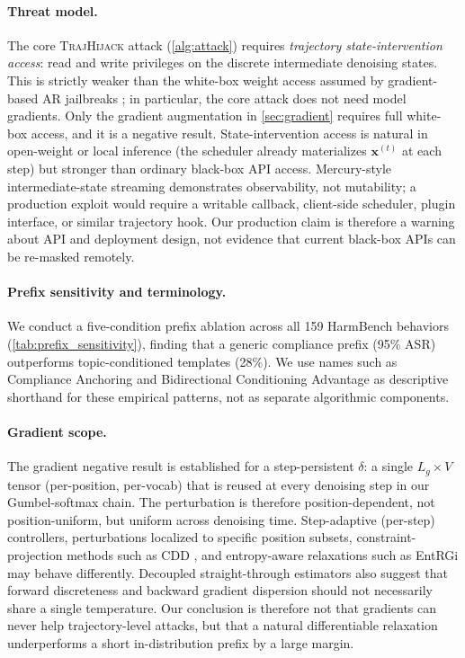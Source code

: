 \documentclass{article}
\theoremstyle{coloredthm}
\newcommand{\method}{\textsc{TrajHijack}}
\begin{document}
\paragraph{Threat model.} The core \method{} attack (\cref{alg:attack}) requires \emph{trajectory state-intervention access}: read and write privileges on the discrete intermediate denoising states. This is strictly weaker than the white-box weight access assumed by gradient-based AR jailbreaks \citep{zou2023gcg, carlini2023adversarial}; in particular, the core attack does not need model gradients. Only the gradient augmentation in \cref{sec:gradient} requires full white-box access, and it is a negative result. State-intervention access is natural in open-weight or local inference (the scheduler already materializes $\mathbf{x}^{(t)}$ at each step) but stronger than ordinary black-box API access. Mercury-style intermediate-state streaming demonstrates observability, not mutability; a production exploit would require a writable callback, client-side scheduler, plugin interface, or similar trajectory hook. Our production claim is therefore a warning about API and deployment design, not evidence that current black-box APIs can be re-masked remotely.

\paragraph{Prefix sensitivity and terminology.} We conduct a five-condition prefix ablation across all 159 HarmBench behaviors (\cref{tab:prefix_sensitivity}), finding that a generic compliance prefix (95\% ASR) outperforms topic-conditioned templates (28\%). We use names such as Compliance Anchoring and Bidirectional Conditioning Advantage as descriptive shorthand for these empirical patterns, not as separate algorithmic components.

\paragraph{Gradient scope.} The gradient negative result is established for a step-persistent $\delta$: a single $L_g \times V$ tensor (per-position, per-vocab) that is reused at every denoising step in our Gumbel-softmax chain. The perturbation is therefore position-dependent, not position-uniform, but uniform across denoising time. Step-adaptive (per-step) controllers, perturbations localized to specific position subsets, constraint-projection methods such as CDD \citep{cardei2025cdd}, and entropy-aware relaxations such as EntRGi \citep{tejaswi2026entrgi} may behave differently. Decoupled straight-through estimators \citep{shah2024decoupled} also suggest that forward discreteness and backward gradient dispersion should not necessarily share a single temperature. Our conclusion is therefore not that gradients can never help trajectory-level attacks, but that a natural differentiable relaxation underperforms a short in-distribution prefix by a large margin.
\end{document}
